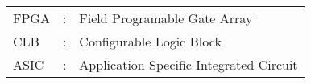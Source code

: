 \begin{tabular}{lcl}
FPGA &: & Field Programable Gate Array\\
CLB &: & Configurable Logic Block \\
ASIC &: & Application Specific Integrated Circuit
\end{tabular}

